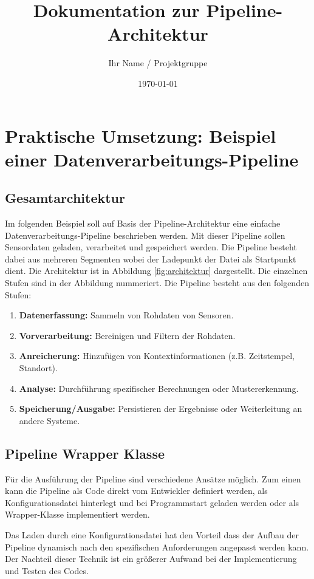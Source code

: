 \documentclass[a4paper]{article} %
\title{Dokumentation zur Pipeline-Architektur}
\author{Ihr Name / Projektgruppe}
\date{\today}
\begin{document}
\maketitle %
\tableofcontents %
\newpage

\section{Praktische Umsetzung: Beispiel einer Datenverarbeitungs-Pipeline}
\subsection{Gesamtarchitektur}
Im folgenden Beispiel soll auf Basis der Pipeline-Architektur eine einfache Datenverarbeitungs-Pipeline beschrieben werden. Mit dieser Pipeline sollen Sensordaten geladen, verarbeitet und gespeichert werden. Die Pipeline besteht dabei aus mehreren Segmenten wobei der Ladepunkt der Datei als Startpunkt dient.
Die Architektur ist in Abbildung \ref{fig:architektur} dargestellt. Die einzelnen Stufen sind in der Abbildung nummeriert.
Die Pipeline besteht aus den folgenden Stufen:
\begin{enumerate}
    \item \textbf{Datenerfassung:} Sammeln von Rohdaten von Sensoren.
    \item \textbf{Vorverarbeitung:} Bereinigen und Filtern der Rohdaten.
    \item \textbf{Anreicherung:} Hinzufügen von Kontextinformationen (z.B. Zeitstempel, Standort).
    \item \textbf{Analyse:} Durchführung spezifischer Berechnungen oder Mustererkennung.
    \item \textbf{Speicherung/Ausgabe:} Persistieren der Ergebnisse oder Weiterleitung an andere Systeme.
\end{enumerate}

\subsection{Pipeline Wrapper Klasse}
Für die Ausführung der Pipeline sind verschiedene Ansätze möglich. Zum einen kann die Pipeline als Code direkt vom Entwickler definiert werden, als Konfigurationsdatei hinterlegt und bei Programmstart geladen werden oder als Wrapper-Klasse implementiert werden.

Das Laden durch eine Konfigurationsdatei hat den Vorteil dass der Aufbau der Pipeline dynamisch nach den spezifischen Anforderungen angepasst werden kann. Der Nachteil dieser Technik ist ein größerer Aufwand bei der Implementierung und Testen des Codes.
\end{document}
